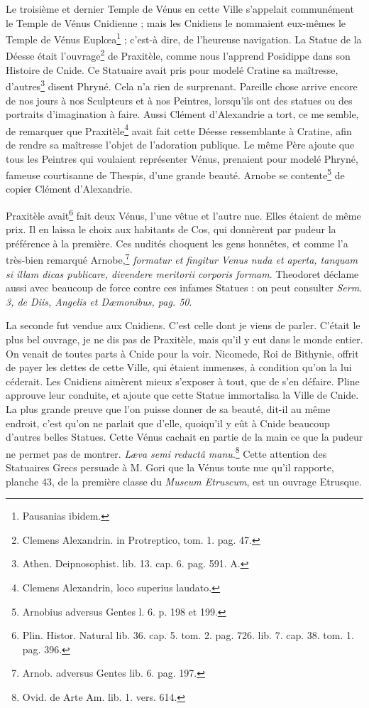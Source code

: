 \documentclass[a4paper, 11pt, oneside, polutonikogreek, french]{article}
\begin{document}
Le troisième et dernier Temple de Vénus en cette Ville s'appelait communément le Temple de Vénus Cnidienne ; mais les Cnidiens le nommaient eux-mêmes le Temple de Vénus Euplœa\footnote{Pausanias ibidem.} ; c'est-à dire, de l'heureuse navigation. La Statue de la Déesse était l'ouvrage\footnote{Clemens Alexandrin. in Protreptico, tom. 1. pag. 47.} de Praxitèle, comme nous l'apprend Posidippe dans son Histoire de Cnide. Ce Statuaire avait pris pour modelé Cratine sa maîtresse, d'autres\footnote{Athen. Deipnosophist. lib. 13. cap. 6. pag. 591. A.} disent Phryné. Cela n'a rien de surprenant. Pareille chose arrive encore de nos jours à nos Sculpteurs et à nos Peintres, lorsqu'ils ont des statues ou des portraits d'imagination à faire. Aussi Clément d'Alexandrie a tort, ce me semble, de remarquer que Praxitèle\footnote{Clemens Alexandrin, loco superius laudato.} avait fait cette Déesse ressemblante à Cratine, afin de rendre sa maîtresse l'objet de l'adoration publique. Le même Père ajoute que tous les Peintres qui voulaient représenter Vénus, prenaient pour modelé Phryné, fameuse courtisanne de Thespis, d'une grande beauté. Arnobe se contente\footnote{Arnobius adversus Gentes l. 6. p. 198 et 199.} de copier Clément d'Alexandrie.

Praxitèle avait\footnote{Plin. Histor. Natural lib. 36. cap. 5. tom. 2. pag. 726. lib. 7. cap. 38. tom. 1. pag. 396.} fait deux Vénus, l'une vêtue et l'autre nue. Elles étaient de même prix. Il en laissa le choix aux habitants de Cos, qui donnèrent par pudeur la préférence à la première. Ces nudités choquent les gens honnêtes, et comme l'a très-bien remarqué Arnobe,\footnote{Arnob. adversus Gentes lib. 6. pag. 197.} \emph{formatur et fingitur Venus nuda et aperta, tanquam si illam dicas publicare, divendere meritorii corporis formam}. Theodoret déclame aussi avec beaucoup de force contre ces infames Statues : on peut consulter \emph{Serm. 3, de Diis, Angelis et Dæmonibus, pag. 50}.

La seconde fut vendue aux Cnidiens. C'est celle dont je viens de parler. C'était le plus bel ouvrage, je ne dis pas de Praxitèle, mais qu'il y eut dans le monde entier. On venait de toutes parts à Cnide pour la voir. Nicomede, Roi de Bithynie, offrit de payer les dettes de cette Ville, qui étaient immenses, à condition qu'on la lui céderait. Les Cnidiens aimèrent mieux s'exposer à tout, que de s'en défaire. Pline approuve leur conduite, et ajoute que cette Statue immortalisa la Ville de Cnide. La plus grande preuve que l'on puisse donner de sa beauté, dit-il au même endroit, c'est qu'on ne parlait que d'elle, quoiqu'il y eût à Cnide beaucoup d'autres belles Statues. Cette Vénus cachait en partie de la main ce que la pudeur ne permet pas de montrer. \emph{Læva semi reductâ manu}.\footnote{Ovid. de Arte Am. lib. 1. vers. 614.} Cette attention des Statuaires Grecs persuade à M. Gori que la Vénus toute nue qu'il rapporte, planche 43, de la première classe du \emph{Museum Etruscum}, est un ouvrage Etrusque.
\end{document}
